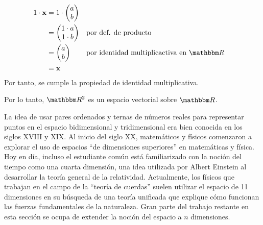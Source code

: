 \begin{examplebox}{}{}
\begin{enumerate}[label=\roman*), topsep=6pt, itemsep=0pt]
\begin{align*}
            1 \cdot \mathbf{x} & = 1 \cdot \begin{pmatrix}
                a \\
                b
            \end{pmatrix} \\
            & = \begin{pmatrix}
                1 \cdot a \\
                1 \cdot b
            \end{pmatrix} && \text{por def. de producto} \\
            & = \begin{pmatrix}
                a \\
                b
            \end{pmatrix} && \text{por identidad multiplicactiva en $\RR$} \\
            & = \mathbf{x}
        \end{align*}
        Por tanto, se cumple la propiedad de identidad multiplicativa.
    \end{enumerate}
    Por lo tanto, $\RR[2]$ es un espacio vectorial sobre $\RR$.
\end{examplebox}

La idea de usar pares ordenados y ternas de números reales para representar puntos en el espacio bidimensional y tridimensional era bien conocida en los siglos XVIII y XIX. Al inicio del siglo XX, matemáticos y físicos comenzaron a explorar el uso de espacios “de dimensiones superiores” en matemáticas y física. Hoy en día, incluso el estudiante común está familiarizado con la noción del tiempo como una cuarta dimensión, una idea utilizada por Albert Einstein al desarrollar la teoría general de la relatividad. Actualmente, los físicos que trabajan en el campo de la “teoría de cuerdas” suelen utilizar el espacio de 11 dimensiones en su búsqueda de una teoría unificada que explique cómo funcionan las fuerzas fundamentales de la naturaleza. Gran parte del trabajo restante en esta sección se ocupa de extender la noción del espacio a $n$ dimensiones.

